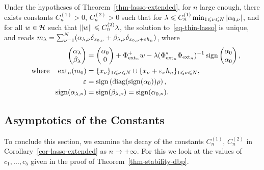 \begin{cor}\label{cor-lasso-extended}
  Under the hypotheses of Theorem~\ref{thm-lasso-extended}, for $n$ large enough, there exists constants $C^{(1)}_n>0$, $C^{(2)}_n>0$ such that 
  for $\lambda\leqslant C^{(1)}_n \min_{1\leqslant \nu\leqslant N} |\alpha_{0,\nu}|$, and for all $w\in \mathcal{H}$ such that $\|w\|\leqslant C^{(2)}_n \lambda$, the solution to~\eqref{eq-thin-lasso} is unique, and reads $m_\lambda=\sum_{\nu=1}^N (\alpha_{\lambda,\nu}\delta_{x_{0,\nu}}  + \beta_{\lambda,\nu}\delta_{x_{0,\nu}+\varepsilon{h_n}})$, where 
\begin{align*}
  \begin{pmatrix}
    \alpha_\lambda\\\beta_\lambda
  \end{pmatrix}&= \begin{pmatrix}
    \alpha_0\\0
  \end{pmatrix}+ \Phi_{\operatorname{ext}_n}^+ w - \lambda (\Phi_{\operatorname{ext}_n}^* \Phi_{\operatorname{ext}_n})^{-1} \operatorname{sign}\begin{pmatrix}
    \alpha_0\\ \alpha_0
  \end{pmatrix},\\
\quad \text{where} \quad   \operatorname{ext}_n(m_0)&= \{x_\nu\}_{1\leqslant \nu\leqslant N}\cup \{x_\nu+\varepsilon_\nu {h_n}\}_{1\leqslant \nu \leqslant N},\\
  \varepsilon&= \operatorname{sign}\left(\operatorname{diag}(\operatorname{sign}(\alpha_0))\rho\right),\\
  \operatorname{sign}(\alpha_{\lambda,\nu})&= \operatorname{sign}(\beta_{\lambda,\nu})=\operatorname{sign}(\alpha_{0,\nu}).
\end{align*}
\end{cor}



\subsection{Asymptotics of the Constants}

To conclude this section, we examine the decay of the constants $C^{(1)}_n$, $C^{(2)}_n$ in Corollary~\ref{cor-lasso-extended} as $n\to +\infty$. For this we look at the values of $c_1, \ldots, c_5$ given in the proof of Theorem~\ref{thm-stability-dbp}.

